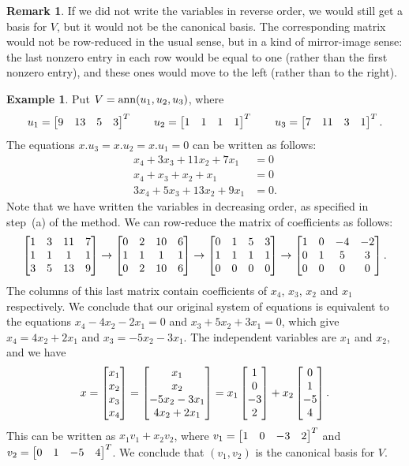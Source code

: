 \documentclass[reqno]{amsart}
\theoremstyle{definition}
\newtheorem{remark}[theorem]{Remark}
\newtheorem{example}[theorem]{Example}
\begin{document}
\begin{remark}\label{rem-mirror}
 If we did not write the variables in reverse order, we would still
 get a basis for $V$, but it would not be the canonical basis.  The
 corresponding matrix would not be row-reduced in the usual sense, but
 in a kind of mirror-image sense: the last nonzero entry in each row
 would be equal to one (rather than the first nonzero entry), and
 these ones would move to the left (rather than to the right).
\end{remark}

\begin{example}\label{eg-ann-basis-i}
 Put $V=\operatorname{ann}(u_1,u_2,u_3)$, where
 \[  u_1 = \left[\begin{matrix} 9& 13&5&3\end{matrix}\right]^T \qquad
     u_2 = \left[\begin{matrix} 1&1&1&1\end{matrix}\right]^T \qquad
     u_3 = \left[\begin{matrix} 7&11&3&1\end{matrix}\right]^T.
 \]
 The equations $x.u_3=x.u_2=x.u_1=0$ can be written as follows:
 \begin{align*}
  x_4 + 3x_3 + 11x_2 + 7x_1 &= 0 \\
  x_4 + x_3 + x_2 + x_1 &= 0 \\
  3x_4+5x_3+13x_2+9x_1 &= 0.
 \end{align*}
 Note that we have written the variables in decreasing order, as
 specified in step~(a) of the method.  We can row-reduce the matrix of
 coefficients as follows:
 \[ \left[\begin{matrix} 1&3&11&7 \\ 1&1&1&1 \\ 3&5&13&9 \end{matrix}\right]
    \to
    \left[\begin{matrix} 0&2&10&6 \\ 1&1&1&1 \\ 0&2&10&6 \end{matrix}\right]
    \to
    \left[\begin{matrix} 0&1&5&3 \\ 1&1&1&1 \\ 0&0&0&0 \end{matrix}\right]
    \to
    \left[\begin{matrix} 1&0&-4&-2 \\ 0&1&5&3 \\ 0&0&0&0 \end{matrix}\right].
 \]
 The columns of this last matrix contain coefficients of $x_4$,
 $x_3$, $x_2$ and $x_1$ respectively.  We conclude that our original
 system of equations is equivalent to the equations $x_4-4x_2-2x_1=0$ and
 $x_3+5x_2+3x_1=0$, which give $x_4=4x_2+2x_1$ and
 $x_3=-5x_2-3x_1$.  The independent variables are $x_1$ and $x_2$, and
 we have
 \[ x = \left[\begin{matrix} x_1\\x_2\\x_3\\x_4 \end{matrix}\right]
      = \left[\begin{matrix} x_1\\x_2\\-5x_2-3x_1\\ 4x_2+2x_1\end{matrix}\right]
      = x_1\left[\begin{matrix} 1\\0\\-3\\2\end{matrix}\right] +
        x_2\left[\begin{matrix} 0\\1\\-5\\4\end{matrix}\right].
 \]
 This can be written as $x_1v_1+x_2v_2$, where $v_1=\left[\begin{matrix} 1&0&-3&2\end{matrix}\right]^T$
 and $v_2=\left[\begin{matrix} 0&1&-5&4\end{matrix}\right]^T$.  We conclude that $(v_1,v_2)$ is the
 canonical basis for $V$.
\end{example}
\end{document}
